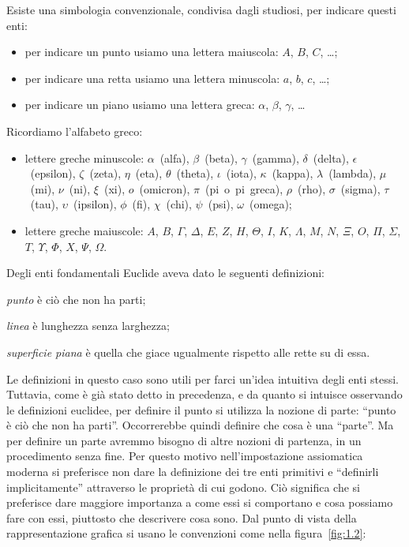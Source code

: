 Esiste una simbologia convenzionale, condivisa dagli studiosi, per 
indicare questi enti:
\begin{itemize}
\item per indicare un punto usiamo una lettera maiuscola: $A$, $B$, 
$C$, \ldots;
\item per indicare una retta usiamo una lettera minuscola: $a$, $b$, 
$c$, \ldots;
\item per indicare un piano usiamo una lettera greca: $\alpha$, 
$\beta$, $\gamma$, \ldots
\end{itemize}

Ricordiamo l'alfabeto greco:
\begin{itemize}
\item lettere greche minuscole:  $\alpha$~(alfa),  $\beta$~(beta),  
$\gamma$~(gamma),  $\delta$~(delta), $\epsilon$~(epsilon), 
$\zeta$~(zeta), $\eta$~(eta), $\theta$~(theta),  $\iota$~(iota),  
$\kappa$~(kappa), $\lambda$~(lambda), $\mu$~(mi), $\nu$~(ni),  
$\xi$~(xi), $o$~(omicron), $\pi$~(pi~o~pi~greca), $\rho$~(rho), 
$\sigma$~(sigma), $\tau$~(tau), $\upsilon$~(ipsilon), $\phi$~(fi), 
$\chi$~(chi), $\psi$~(psi), $\omega$~(omega);
\item lettere greche maiuscole: $A$, $B$, $ \Gamma $, $ \Delta $, $ E 
$, $ Z $, $ H $, $ \Theta $, $ I $, $ K $, $ \Lambda $, $ M $, $ N $, 
$ \Xi $, $ O $, $ \Pi $, $ \Sigma $, $ T $, $ \Upsilon $, $ \Phi $, $ 
X $, $ \Psi $, $\Omega $.
\end{itemize}

Degli enti fondamentali Euclide aveva dato le seguenti definizioni:
\begin{itemize*}
\item \emph{punto} è ciò che non ha parti;
\item \emph{linea} è lunghezza senza larghezza;
\item \emph{superficie piana} è quella che giace ugualmente rispetto 
alle rette su di essa.
\end{itemize*}
Le definizioni in questo caso sono utili per farci un'idea intuitiva 
degli enti stessi. Tuttavia, come è già stato detto in precedenza, e 
da quanto si intuisce osservando le definizioni euclidee, per 
definire il punto si utilizza la nozione di parte: ``punto è ciò che 
non ha parti''. Occorrerebbe quindi definire che cosa è una 
``parte''. Ma per definire un parte avremmo bisogno di altre nozioni 
di partenza, in un procedimento senza fine. Per questo motivo 
nell'impostazione assiomatica moderna si preferisce non dare la 
definizione dei tre enti primitivi e ``definirli implicitamente'' 
attraverso le proprietà di cui godono. Ciò significa che si 
preferisce dare maggiore importanza a come essi si comportano e cosa 
possiamo fare con essi, piuttosto che descrivere cosa sono.
Dal punto di vista della rappresentazione grafica si usano le 
convenzioni come nella figura~\ref{fig:1.2}:
% 

